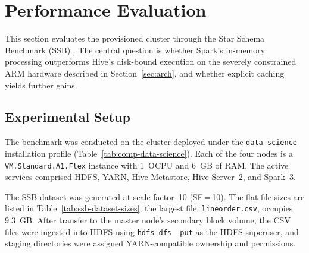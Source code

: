
\section{Performance Evaluation}
\label{sec:use-case}


This section evaluates the provisioned cluster through the Star Schema Benchmark
(SSB) \citep{oneil2009star}. The central question is whether Spark's in-memory
processing outperforms Hive's disk-bound execution on the severely constrained
ARM hardware described in Section~\ref{sec:arch}, and whether explicit caching
yields further gains.

\subsection{Experimental Setup}

The benchmark was conducted on the cluster deployed under the
\texttt{data-science} installation profile
(Table~\ref{tab:comp-data-science}). Each of the four nodes is a
\texttt{VM.Standard.A1.Flex} instance with 1~OCPU and 6~GB of RAM. The active
services comprised HDFS, YARN, Hive Metastore, Hive Server~2, and Spark~3.

The SSB dataset was generated at scale factor~10 (SF\,=\,10). The flat-file
sizes are listed in Table~\ref{tab:ssb-dataset-sizes}; the largest file,
\texttt{lineorder.csv}, occupies 9.3~GB. After transfer to the master node's
secondary block volume, the CSV files were ingested into HDFS using
\texttt{hdfs dfs~-put} as the HDFS superuser, and staging directories were
assigned YARN-compatible ownership and permissions.


